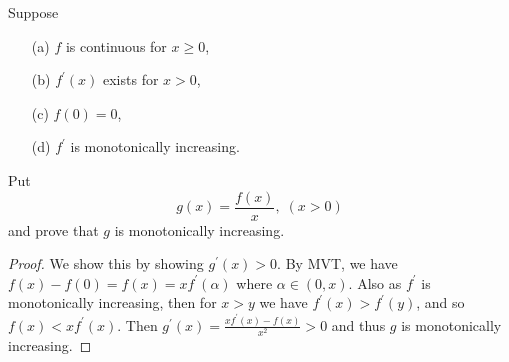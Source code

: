 \documentclass[oneside]{amsart}
\theoremstyle{definition}
\newcommand{\pp}{\prime}
\begin{document}
\begin{tcolorbox}[colback=black!5!white,colframe=black!75!black,title= Exercise $6.5.$] Suppose \begin{itemize}
	\item [(a)] $f$ is continuous for $x \geq 0$,
	\item [(b)] $f^\pp (x)$ exists for $x > 0$, 
	\item [(c)] $f(0) = 0$,
	\item [(d)] $f^\pp$ is monotonically increasing. 
\end{itemize}
Put $$ g(x) = \frac{f(x)}{x}, \; (x>0)$$
and prove that $g$ is monotonically increasing.
\tcblower 
\begin{proof} We show this by showing $g^ \pp (x) > 0$. By MVT, we have $f(x) - f(0) =f(x) =  xf^\pp (\alpha )$ where $\alpha \in (0,x)$. Also as $f^\pp$ is monotonically increasing, then for $x> y$ we have  $f^\pp (x)>f^\pp (y)$, and so $f(x) <xf^\pp (x)$. Then $g^\pp (x) = \frac{xf^\pp (x)-f(x)}{x^2} > 0$ and thus $g$ is monotonically increasing. 
\end{proof} 
\end{tcolorbox}
\end{document}
